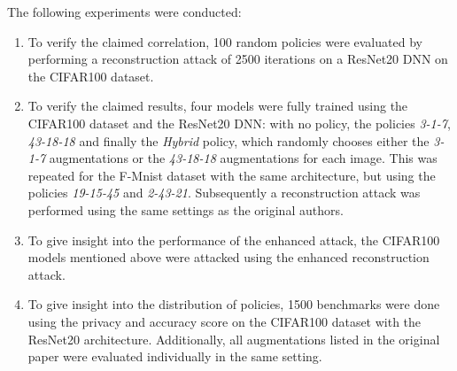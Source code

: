 
The following experiments were conducted:
\begin{enumerate}
    \item To verify the claimed correlation, 100 random policies were evaluated by performing a reconstruction attack of 2500 iterations on a ResNet20 DNN on the CIFAR100 dataset.
    \item To verify the claimed results, four models were fully trained using the CIFAR100 dataset and the ResNet20 DNN: with no policy, the policies \textit{3-1-7}, \textit{43-18-18} and finally the \textit{Hybrid} policy, which randomly chooses either the \textit{3-1-7} augmentations or the \textit{43-18-18} augmentations for each image. This was repeated for the F-Mnist dataset with the same architecture, but using the policies \textit{19-15-45} and \textit{2-43-21}. Subsequently a reconstruction attack was performed using the same settings as the original authors.
    \item To give insight into the performance of the enhanced attack, the CIFAR100 models mentioned above were attacked using the enhanced reconstruction attack.
    \item To give insight into the distribution of policies, 1500 benchmarks were done using the privacy and accuracy score on the CIFAR100 dataset with the ResNet20 architecture. Additionally, all augmentations listed in the original paper were evaluated individually in the same setting.

\end{enumerate}


